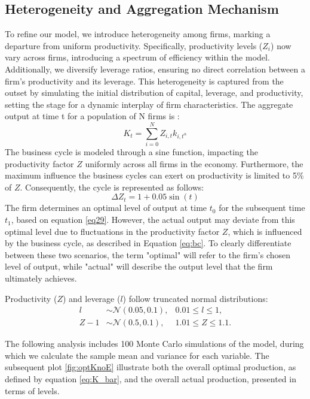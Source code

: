 \documentclass[12pt]{report}
\begin{document}
\subsection{Heterogeneity and Aggregation Mechanism}

To refine our model, we introduce heterogeneity among firms, marking a departure from uniform productivity.  Specifically, productivity levels (\( Z_i \)) now vary across firms, introducing a spectrum of efficiency within
the model. Additionally, we diversify leverage ratios, ensuring no direct correlation between a firm's productivity and
its leverage. This heterogeneity is captured from the outset by simulating the initial distribution of capital,
leverage, and productivity, setting the stage for a dynamic interplay of firm characteristics. The aggregate output at
time t for a population of N firms
is :
\begin{equation}
    K_t = \sum_{i=0}^{N}{Z_{i,t}k_{i,t^\alpha}} \label{eq:K_bar}
\end{equation}
The business cycle is modeled through a sine function, impacting the productivity factor \(Z\) uniformly across all firms in the economy. Furthermore, the maximum influence the business cycles can exert on productivity is limited to 5\% of \(Z\). Consequently, the cycle is represented as follows:
\begin{equation}
    \Delta Z_t = 1 + 0.05 \sin(t) \label{eq:bc}
\end{equation}
The firm determines an optimal level of output at time \(t_0\) for the subsequent time \(t_1\), based on equation
\ref{eq29}. However, the actual output may deviate from this optimal level due to fluctuations in the productivity
factor \(Z\), which is influenced by the business cycle, as described in Equation \ref{eq:bc}. To clearly differentiate
between these two scenarios, the term "optimal" will refer to the firm's chosen level of output, while "actual" will
describe the output level that the firm ultimately achieves. 

Productivity (\(Z\)) and leverage (\(l\)) follow truncated normal distributions:
\begin{align}
    l &\sim \mathcal{N}(0.05, 0.1), & 0.01 \leq l \leq 1, \\
    Z-1 &\sim \mathcal{N}(0.5, 0.1), & 1.01 \leq Z \leq 1.1.
\end{align}

The following analysis includes 100 Monte Carlo simulations of the model, during which we calculate the sample mean and
variance for each variable. The subsequent plot \autoref{fig:optKnoE} illustrate both the overall optimal production, as defined by equation
\ref{eq:K_bar}, and the overall actual production, presented in terms of levels. 
\end{document}
